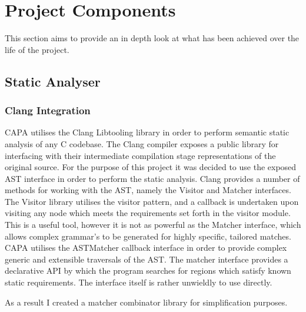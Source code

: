 
\section{Project Components}

This section aims to provide an in depth look at what has been achieved over the life of the
project.

\subsection{Static Analyser}

\subsubsection{Clang Integration}
CAPA utilises the Clang Libtooling library in order to perform semantic static analysis of any C
codebase. The Clang compiler exposes a public library for interfacing with their intermediate
compilation stage representations of the original source. For the purpose of this project it was
decided to use the exposed AST interface in order to perform the static analysis. Clang provides a
number of methods for working with the AST, namely the Visitor and Matcher interfaces. The Visitor
library utilises the visitor pattern, and a callback is undertaken upon visiting any node which
meets the requirements set forth in the visitor module. This is a useful tool, however it is not as
powerful as the Matcher interface, which allows complex grammar's to be generated for highly
specific, tailored matches. CAPA utilises the ASTMatcher callback interface in order to provide complex
generic and extensible traversals of the AST. The matcher interface provides a declarative API by
which the program searches for regions which satisfy known static requirements. The interface itself
is rather unwieldly to use directly. 

As a result I created a matcher combinator library for simplification purposes.

